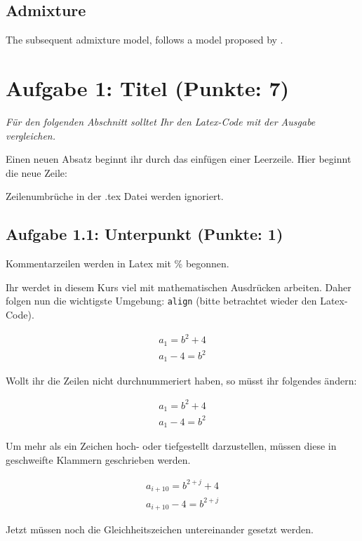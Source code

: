 \documentclass[a4paper, 11pt]{article}
\begin{document}
\subsection*{Admixture}
The subsequent admixture model, follows a model proposed by \cite{pritchard2000inference}. 



\newpage
\section*{Aufgabe 1: Titel (Punkte: 7)}

\emph{Für den folgenden Abschnitt solltet Ihr den Latex-Code mit der Ausgabe vergleichen.}

Einen neuen Absatz beginnt ihr durch das einfügen einer Leerzeile.
Hier beginnt die neue Zeile:

Zeilenumbrüche in der .tex Datei werden 
ignoriert.

\subsection*{Aufgabe 1.1: Unterpunkt (Punkte: 1)}

Kommentarzeilen werden in Latex mit \% begonnen.

Ihr werdet in diesem Kurs viel mit mathematischen Ausdrücken arbeiten.
Daher folgen nun die wichtigste Umgebung: \texttt{align} (bitte betrachtet wieder den Latex-Code).

\begin{align}
	a_1 = b^2 +4 \\
	a_1 - 4 = b^2
\end{align}

Wollt ihr die Zeilen nicht durchnummeriert haben, so müsst ihr folgendes ändern:

\begin{align*}
	a_1 = b^2 +4 \\
	a_1 - 4 = b^2
\end{align*}

Um mehr als ein Zeichen hoch- oder tiefgestellt darzustellen, müssen diese in geschweifte Klammern geschrieben werden.

\begin{align}
	a_{i+10} = b^{2+j} +4 \\
	a_{i+10} - 4 = b^{2+j}
\end{align}

Jetzt müssen noch die Gleichheitszeichen untereinander gesetzt werden.
\end{document}
